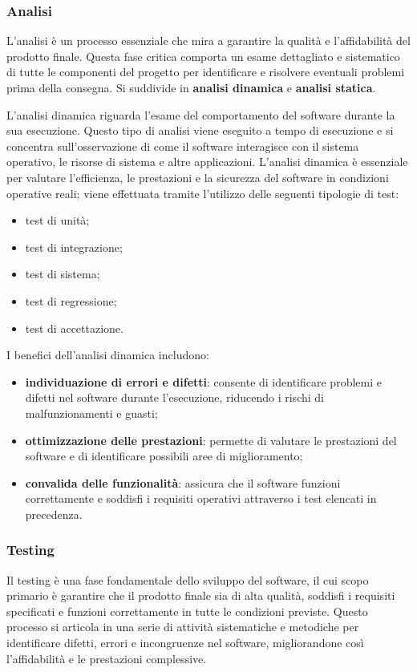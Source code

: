 \subsubsection{Analisi}
L'analisi è un processo essenziale che mira a garantire la qualità e l'affidabilità del prodotto finale. Questa fase critica comporta un esame dettagliato e sistematico di tutte le componenti del progetto per identificare e risolvere eventuali problemi prima della consegna. Si suddivide in \textbf{analisi dinamica} e \textbf{analisi statica}.

L'analisi dinamica riguarda l'esame del comportamento del software durante la sua esecuzione. Questo tipo di analisi viene eseguito a tempo di esecuzione e si concentra sull'osservazione di come il software interagisce con il sistema operativo, le risorse di sistema e altre applicazioni. L'analisi dinamica è essenziale per valutare l'efficienza, le prestazioni e la sicurezza del software in condizioni operative reali; viene effettuata tramite l'utilizzo delle seguenti tipologie di test:
\begin{itemize}
	\item test di unità;
	\item test di integrazione;
	\item test di sistema;
	\item test di regressione;
	\item test di accettazione.
\end{itemize}

I benefici dell'analisi dinamica includono:
\begin{itemize}
	\item \textbf{individuazione di errori e difetti}: consente di identificare problemi e difetti nel software durante l'esecuzione, riducendo i rischi di malfunzionamenti e guasti;
	\item \textbf{ottimizzazione delle prestazioni}: permette di valutare le prestazioni del software e di identificare possibili aree di miglioramento;
	\item \textbf{convalida delle funzionalità}: assicura che il software funzioni correttamente e soddisfi i requisiti operativi attraverso i test elencati in precedenza.
\end{itemize}

\hypertarget{testing}{\subsubsection{Testing}}
Il testing è una fase fondamentale dello sviluppo del software, il cui scopo primario è garantire che il prodotto finale sia di alta qualità, soddisfi i requisiti specificati e funzioni correttamente in tutte le condizioni previste. Questo processo si articola in una serie di attività sistematiche e metodiche per identificare difetti, errori e incongruenze nel software, migliorandone così l'affidabilità e le prestazioni complessive.

